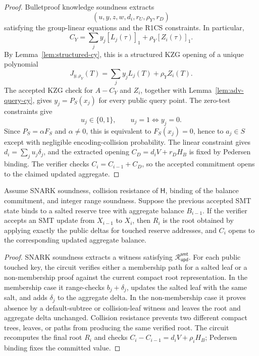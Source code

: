 \documentclass[runningheads]{llncs}
\newcommand{\CRH}{\mathsf{H}}
\newcommand{\Rel}{\mathcal{R}}
\begin{document}
\begin{proof}
Bulletproof knowledge soundness extracts
\[
        (u,y,z,w,d_i,r_U,\rho_Y,r_D)
\]
satisfying the group-linear equations and the R1CS constraints.  In particular,
\[
        C_Y=\sum_j y_j[L_j(\tau)]_1+\rho_Y[Z_i(\tau)]_1.
\]
By Lemma~\ref{lem:structured-cy}, this is a structured KZG opening of a unique polynomial
\[
        J_{y,\rho_Y}(T)=\sum_j y_jL_j(T)+\rho_YZ_i(T).
\]
The accepted KZG check for \(A-C_Y\) and \(Z_i\), together with Lemma~\ref{lem:adv-query-cy}, gives \(y_j=P_S(x_j)\) for every public query point.  The zero-test constraints give
\[
        u_j\in\{0,1\},\qquad u_j=1 \Longleftrightarrow y_j=0 .
\]
Since \(P_S=\alpha F_S\) and \(\alpha\ne0\), this is equivalent to \(F_S(x_j)=0\), hence to \(a_j\in S\) except with negligible encoding-collision probability.  The linear constraint gives \(d_i=\sum_j u_j\delta_j\), and the extracted opening \(C_D=d_iV+r_DH_B\) is fixed by Pedersen binding.  The verifier checks \(C_i=C_{i-1}+C_D\), so the accepted commitment opens to the claimed updated aggregate.
\end{proof}

\begin{theorem}\label{thm:smt-update-sound}
Assume SNARK soundness, collision resistance of \(\CRH\), binding of the balance commitment, and integer range soundness.  Suppose the previous accepted SMT state binds to a salted reserve tree with aggregate balance \(B_{i-1}\).  If the verifier accepts an SMT update from \(X_{i-1}\) to \(X_i\), then \(R_i\) is the root obtained by applying exactly the public deltas for touched reserve addresses, and \(C_i\) opens to the corresponding updated aggregate balance.
\end{theorem}

\begin{proof}
SNARK soundness extracts a witness satisfying \(\Rel_{\mathsf{upd}}^{\mathsf{smt}}\).  For each public touched key, the circuit verifies either a membership path for a salted leaf or a non-membership proof against the current compact root representation.  In the membership case it range-checks \(b_j+\delta_j\), updates the salted leaf with the same salt, and adds \(\delta_j\) to the aggregate delta.  In the non-membership case it proves absence by a default-subtree or collision-leaf witness and leaves the root and aggregate delta unchanged.  Collision resistance prevents two different compact trees, leaves, or paths from producing the same verified root.  The circuit recomputes the final root \(R_i\) and checks \(C_i-C_{i-1}=d_iV+\rho_iH_B\); Pedersen binding fixes the committed value.
\end{proof}
\end{document}

